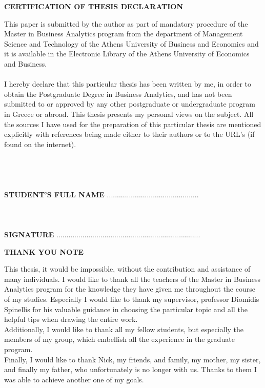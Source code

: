 \documentclass{book}
\begin{document}
\newpage
\begin{center}
\textbf{CERTIFICATION OF THESIS DECLARATION}
\end{center}
This paper is submitted by the author as part of mandatory procedure of the Master in Business Analytics program from the department of Management Science and Technology of the Athens University of Business and Economics and it is available in the Electronic Library of the Athens University of Economics and Business.\\\\
I hereby declare that this particular thesis has been written by me, in order  to obtain the Postgraduate Degree in Business Analytics, and has not been submitted to or approved by any other postgraduate or undergraduate program in Greece or abroad. This thesis presents my personal views on the subject. All the sources I have used for the preparation of this particular thesis are mentioned explicitly with  references being made either to their authors or to the URL’s (if found on the internet).\\\\\\\\\\
\textbf{STUDENT'S FULL NAME}
..............................................\\\\\\\\
\textbf{SIGNATURE}
........................................................................\\
\newpage
\begin{center}
\textbf{THANK YOU NOTE}
\end{center}
This thesis, it would be impossible, without the contribution and assistance of many individuals. I would like to thank all the teachers of the Master in Business Analytics program for the knowledge they have given me throughout the course of my studies. Especially I would like to thank my supervisor, professor Diomidis Spinellis for his valuable guidance in choosing the particular topic and all the helpful tips when drawing the entire work.\\
Additionally, I would like to thank all my fellow students, but especially the members of my group, which embellish all the experience in the graduate program. \\
Finally, I would like to thank Nick, my friends, and family, my mother, my sister, and finally my father, who unfortunately is no longer with us. Thanks to them I was able to achieve another one of my goals.
\end{document}
